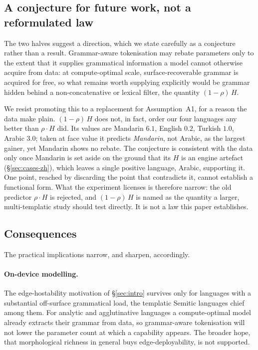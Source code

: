 \subsection{A conjecture for future work, not a reformulated law}
\label{sec:discussion-reformulated}

The two halves suggest a direction, which we state carefully as a conjecture rather than a result. Grammar-aware tokenisation may rebate parameters only to the extent that it supplies grammatical information a model cannot otherwise acquire from data: at compute-optimal scale, surface-recoverable grammar is acquired for free, so what remains worth supplying explicitly would be grammar hidden behind a non-concatenative or lexical filter, the quantity $(1-\rho)\,H$.

We resist promoting this to a replacement for Assumption~A1, for a reason the data make plain. $(1-\rho)\,H$ does not, in fact, order our four languages any better than $\rho \cdot H$ did. Its values are Mandarin $6.1$, English $0.2$, Turkish $1.0$, Arabic $3.0$; taken at face value it predicts \emph{Mandarin}, not Arabic, as the largest gainer, yet Mandarin shows no rebate. The conjecture is consistent with the data only once Mandarin is set aside on the ground that its $H$ is an engine artefact (\S\ref{sec:cases-zh}), which leaves a single positive language, Arabic, supporting it. One point, reached by discarding the point that contradicts it, cannot establish a functional form. What the experiment licenses is therefore narrow: the old predictor $\rho \cdot H$ is rejected, and $(1-\rho)\,H$ is named as the quantity a larger, multi-templatic study should test directly. It is not a law this paper establishes.

\subsection{Consequences}
\label{sec:discussion-consequences}

The practical implications narrow, and sharpen, accordingly.

\paragraph{On-device modelling.} The edge-hostability motivation of \S\ref{sec:intro} survives only for languages with a substantial off-surface grammatical load, the templatic Semitic languages chief among them. For analytic and agglutinative languages a compute-optimal model already extracts their grammar from data, so grammar-aware tokenisation will not lower the parameter count at which a capability appears. The broader hope, that morphological richness in general buys edge-deployability, is not supported.


